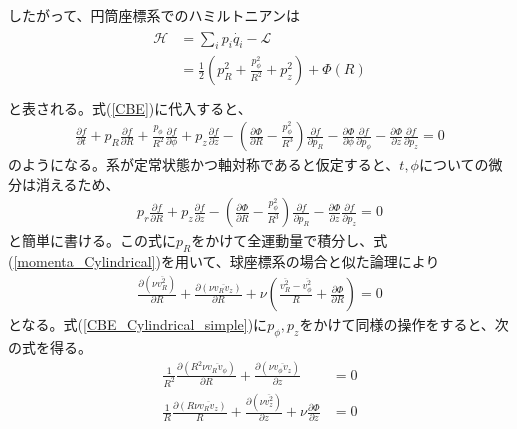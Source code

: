 したがって、円筒座標系でのハミルトニアンは
\begin{align}
\begin{aligned}
	\mathcal{H} &= \sum_i p_i \dot{q_i} - \mathcal{L} \\
	&= \frac{1}{2}\left(p_R^2 + \frac{p_{\phi}^2}{R^2} + p_z^2 \right) + \Phi(R) \\
\end{aligned}
\end{align}
と表される。式(\ref{CBE})に代入すると、
\begin{align}
	\frac{\partial f}{\partial t} + p_R\frac{\partial f}{\partial R} + \frac{p_{\phi}}{R^2}\frac{\partial f}{\partial \phi} + p_z\frac{\partial f}{\partial z} - \left(\frac{\partial \Phi}{\partial R} - \frac{p_{\phi}^2}{R^3} \right)\frac{\partial f}{\partial p_R} - \frac{\partial \Phi}{\partial \phi}\frac{\partial f}{\partial p_{\phi}} - \frac{\partial \Phi}{\partial z}\frac{\partial f}{\partial p_z} = 0   \label{CBE_Cylindrical}
\end{align}
のようになる。系が定常状態かつ軸対称であると仮定すると、$t,\phi$についての微分は消えるため、
\begin{align}
	p_r\frac{\partial f}{\partial R} + p_z\frac{\partial f}{\partial z} - \left(\frac{\partial \Phi}{\partial R} - \frac{p_{\phi}^2}{R^3} \right)\frac{\partial f}{\partial p_R} - \frac{\partial \Phi}{\partial z}\frac{\partial f}{\partial p_z} = 0    \label{CBE_Cylindrical_simple}
\end{align}
と簡単に書ける。この式に$p_R$をかけて全運動量で積分し、式(\ref{momenta_Cylindrical})を用いて、球座標系の場合と似た論理により
\begin{align}
	\frac{\partial (\nu \overline{v_R^2})}{\partial R} + \frac{\partial (\nu \overline{v_R v_z})}{\partial R} + \nu\left(\frac{\overline{v_R^2} - \overline{v_{\phi}^2}}{R} + \frac{\partial \Phi}{\partial R} \right) = 0   \label{Jeans_Cylindrical_pr}
\end{align}
となる。式(\ref{CBE_Cylindrical_simple})に$p_{\phi}, p_z$をかけて同様の操作をすると、次の式を得る。
\begin{align}
	\frac{1}{R^2}\frac{\partial (R^2\nu \overline{v_R v_{\phi}})}{\partial R} + \frac{\partial (\nu \overline{v_{\phi} v_z})}{\partial z} &= 0 \label{Jeans_Cylindrical_pphi}  \\
	\frac{1}{R}\frac{\partial(R\nu\overline{v_R v_z})}{R} + \frac{\partial(\nu\overline{v_z^2})}{\partial z} + \nu\frac{\partial \Phi}{\partial z} &= 0   \label{Jeans_Cylindrical_pz}
\end{align}
